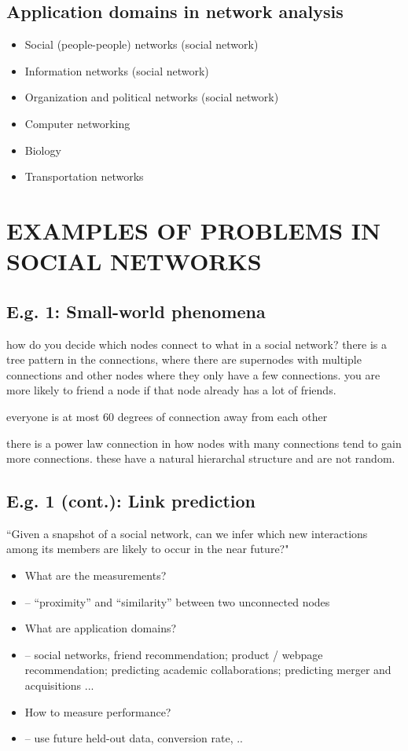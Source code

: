 \documentclass[11pt]{article}
\theoremstyle{definition}
\begin{document}
\subsection{Application domains in network analysis}
\begin{itemize}
    \item Social (people-people) networks (social network)
    \item Information networks (social network)
    \item Organization and political networks (social network)
    \item Computer networking
    \item Biology
    \item Transportation networks
\end{itemize}

\section{EXAMPLES OF PROBLEMS IN
SOCIAL NETWORKS}
\subsection{E.g. 1: Small-world phenomena}
how do you decide which nodes connect to what in a social network?
there is a tree pattern in the connections, where there are supernodes with multiple connections
and other nodes where they only have a few connections.
you are more likely to friend a node if that node already has a lot of friends.

everyone is at most 60 degrees of connection away from each other

there is a power law connection in how nodes with many connections tend to gain more 
connections. these have a natural hierarchal structure and are not random.
\subsection{E.g. 1 (cont.): Link prediction}
“Given a snapshot of a social network, can we infer which new interactions
among its members are likely to occur in the near future?"
\begin{itemize}
    \item What are the measurements?
    \item -- “proximity” and “similarity” between two unconnected nodes
    \item What are application domains?
    \item -- social networks, friend recommendation; product / webpage
    recommendation; predicting academic collaborations; predicting merger and
    acquisitions ...
    \item How to measure performance?
    \item -- use future held-out data, conversion rate, ..
\end{itemize}
\end{document}
